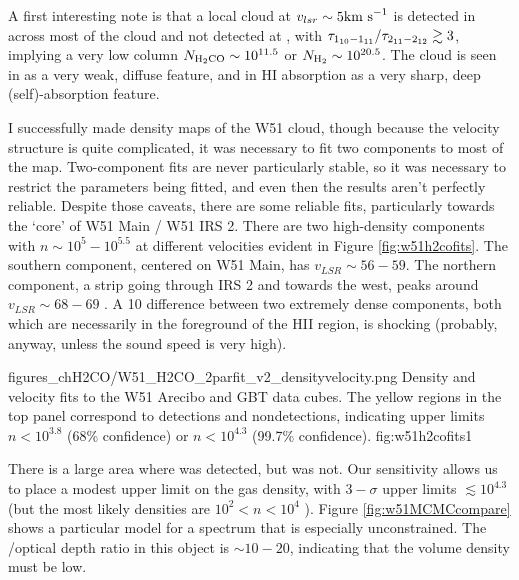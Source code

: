 A first interesting note is that a local cloud at $v_{lsr}\sim5 \textrm{km~s}^{-1}$ is
detected in \formaldehyde \oneone across most of the cloud and not detected at
\twotwo, with $\tau_{1_{10}-1_{11}}/\tau_{2_{11}-2_{12}} \gtrsim 3$, implying a
very low column
$N_{\textrm{H}_2\textrm{CO}}\sim10^{11.5}$ or $N_{\textrm{H}_{2}} \sim 10^{20.5}$.  
The cloud is seen in \thirteenco as a very weak, diffuse feature, and in HI absorption
as a very sharp, deep (self)-absorption feature.


I successfully made density maps of the W51 cloud, though because the velocity
structure is quite complicated, it was necessary to fit two components to most of the
map.  Two-component fits are never particularly stable, so it was necessary to
restrict the parameters being fitted, and even then the results aren't
perfectly reliable.  Despite those caveats, there are some reliable fits,
particularly towards the `core' of W51 Main / W51 IRS 2.  There are two
high-density components with $n\sim10^5-10^{5.5}$ \percc at different velocities evident
in Figure \ref{fig:w51h2cofits}.  The southern component, centered on W51 Main,
has $v_{LSR}\sim56-59$.  The northern component, a strip going through IRS 2
and towards the west, peaks around $v_{LSR}\sim68-69$ \kms.  A 10 \kms difference
between two extremely dense components, both which are necessarily in the
foreground of the HII region, is shocking (probably, anyway, unless the sound
speed is very high).


{figures_chH2CO/W51_H2CO_2parfit_v2_densityvelocity.png}
{Density and velocity fits to the W51 Arecibo and GBT \formaldehyde 
data cubes.  The yellow regions in the top panel correspond to \oneone
detections and \twotwo nondetections, indicating upper limits $n<10^{3.8}$
(68\% confidence) or $n<10^{4.3}$ (99.7\% confidence).}
{fig:w51h2cofits}{1}

There is a large area where \oneone was detected, but \twotwo was not.  Our
sensitivity allows us to place a modest upper limit on the gas density, with
$3-\sigma$ upper limits $\lesssim10^{4.3}$ \percc (but the most likely
densities are $10^2 < n < 10^4$ \percc).  Figure \ref{fig:w51MCMCcompare} shows
a particular model for a spectrum that is especially unconstrained.  The
\oneone/\twotwo optical depth ratio in this object is $\sim10-20$, indicating that
the volume density must be low.

